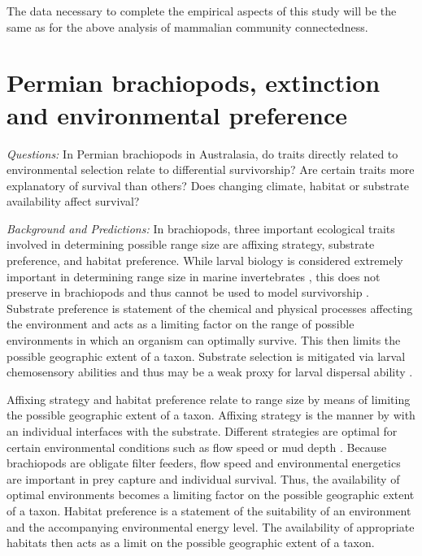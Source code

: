 \documentclass[12pt,letterpaper]{article}
\begin{document}
The data necessary to complete the empirical aspects of this study will be the same as for the above analysis of mammalian community connectedness.


\section{Permian brachiopods, extinction and environmental preference}

\textit{Questions:} In Permian brachiopods in Australasia, do traits directly related to environmental selection relate to differential survivorship? Are certain traits more explanatory of survival than others? Does changing climate, habitat or substrate availability affect survival?

\textit{Background and Predictions:}
In brachiopods, three important ecological traits involved in determining possible range size are affixing strategy, substrate preference, and habitat preference. While larval biology is considered extremely important in determining range size in marine invertebrates \citep{Jablonski2006a,Jablonski1983}, this does not preserve in brachiopods and thus cannot be used to model survivorship \citep{Jablonski1983}. Substrate preference is statement of the chemical and physical processes affecting the environment and acts as a limiting factor on the range of possible environments in which an organism can optimally survive. This then limits the possible geographic extent of a taxon. Substrate selection is mitigated via larval chemosensory abilities and thus may be a weak proxy for larval dispersal ability \citep{Jablonski2006a,Jablonski1983}. 

Affixing strategy and habitat preference relate to range size by means of limiting the possible geographic extent of a taxon. Affixing strategy is the manner by with an individual interfaces with the substrate. Different strategies are optimal for certain environmental conditions such as flow speed or mud depth \citep{Alexander1977,LaBarbera1978,LaBarbera1981}. Because brachiopods are obligate filter feeders, flow speed and environmental energetics are important in prey capture and individual survival. Thus, the availability of optimal environments becomes a limiting factor on the possible geographic extent of a taxon. Habitat preference is a statement of the suitability of an environment and the accompanying environmental energy level. The availability of appropriate habitats then acts as a limit on the possible geographic extent of a taxon. 
\end{document}
